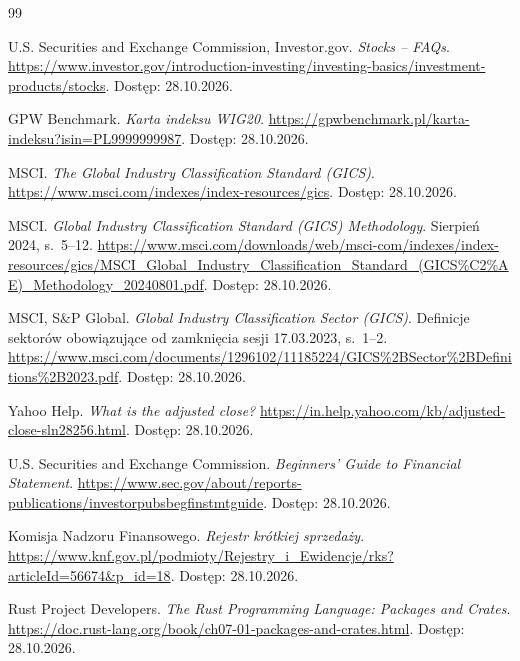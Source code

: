 \documentclass[12pt,a4paper,twoside]{report}
\begin{document}
\cleardoublepage
{}
{}
\begin{thebibliography}{99}

U.S. Securities and Exchange Commission, Investor.gov.
\newblock \textit{Stocks -- FAQs}.
\newblock \url{https://www.investor.gov/introduction-investing/investing-basics/investment-products/stocks}.
\newblock Dostęp: 28.10.2026.

GPW Benchmark.
\newblock \textit{Karta indeksu WIG20}.
\newblock \url{https://gpwbenchmark.pl/karta-indeksu?isin=PL9999999987}.
\newblock Dostęp: 28.10.2026.

MSCI.
\newblock \textit{The Global Industry Classification Standard (GICS)}.
\newblock \url{https://www.msci.com/indexes/index-resources/gics}.
\newblock Dostęp: 28.10.2026.

MSCI.
\newblock \textit{Global Industry Classification Standard (GICS) Methodology}.
\newblock Sierpień 2024, s.~5--12.
\newblock \url{https://www.msci.com/downloads/web/msci-com/indexes/index-resources/gics/MSCI_Global_Industry_Classification_Standard_(GICS%C2%AE)_Methodology_20240801.pdf}.
\newblock Dostęp: 28.10.2026.

MSCI, S\&P Global.
\newblock \textit{Global Industry Classification Sector (GICS)}.
\newblock Definicje sektorów obowiązujące od zamknięcia sesji 17.03.2023, s.~1--2.
\newblock \url{https://www.msci.com/documents/1296102/11185224/GICS%2BSector%2BDefinitions%2B2023.pdf}.
\newblock Dostęp: 28.10.2026.

Yahoo Help.
\newblock \textit{What is the adjusted close?}
\newblock \url{https://in.help.yahoo.com/kb/adjusted-close-sln28256.html}.
\newblock Dostęp: 28.10.2026.

U.S. Securities and Exchange Commission.
\newblock \textit{Beginners' Guide to Financial Statement}.
\newblock \url{https://www.sec.gov/about/reports-publications/investorpubsbegfinstmtguide}.
\newblock Dostęp: 28.10.2026.

Komisja Nadzoru Finansowego.
\newblock \textit{Rejestr krótkiej sprzedaży}.
\newblock \url{https://www.knf.gov.pl/podmioty/Rejestry_i_Ewidencje/rks?articleId=56674&p_id=18}.
\newblock Dostęp: 28.10.2026.

Rust Project Developers.
\newblock \textit{The Rust Programming Language: Packages and Crates}.
\newblock \url{https://doc.rust-lang.org/book/ch07-01-packages-and-crates.html}.
\newblock Dostęp: 28.10.2026.


\end{thebibliography}
\end{document}

